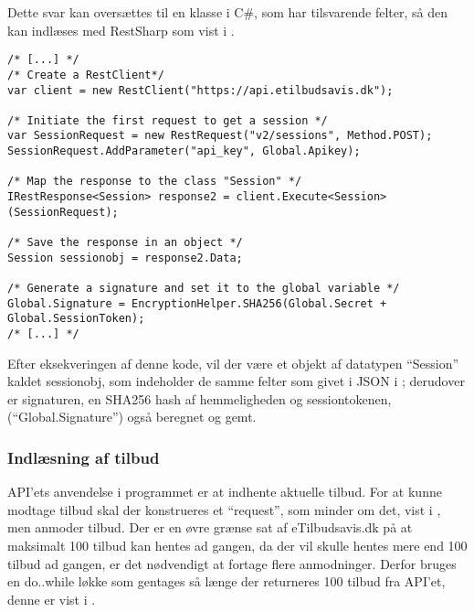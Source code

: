 Dette svar kan oversættes til en klasse i C\#, som har tilsvarende felter, så den kan indlæses med RestSharp som vist i .

\begin{lstlisting}[caption="C\#-kode som opretter en RestClient og anvender den til at oprette et objekt med felter som svarer til JSON dataet givet fra API'en", label=lst:session]
/* [...] */
/* Create a RestClient*/
var client = new RestClient("https://api.etilbudsavis.dk");

/* Initiate the first request to get a session */
var SessionRequest = new RestRequest("v2/sessions", Method.POST);
SessionRequest.AddParameter("api_key", Global.Apikey);

/* Map the response to the class "Session" */
IRestResponse<Session> response2 = client.Execute<Session>(SessionRequest);

/* Save the response in an object */
Session sessionobj = response2.Data;

/* Generate a signature and set it to the global variable */
Global.Signature = EncryptionHelper.SHA256(Global.Secret + Global.SessionToken);
/* [...] */
\end{lstlisting}
Efter eksekveringen af denne kode, vil der være et objekt af datatypen ``Session'' kaldet sessionobj, som indeholder de samme felter som givet i JSON i ; derudover er signaturen, en SHA256 hash af hemmeligheden og sessiontokenen, (``Global.Signature'') også beregnet og gemt.

\subsubsection{Indlæsning af tilbud}
API'ets anvendelse i programmet er at indhente aktuelle tilbud.
For at kunne modtage tilbud skal der konstrueres et ``request'', som minder om det, vist i , men anmoder tilbud.
Der er en øvre grænse sat af eTilbudsavis.dk på at maksimalt 100 tilbud kan hentes ad gangen, da der vil skulle hentes mere end 100 tilbud ad gangen, er det nødvendigt at fortage flere anmodninger.
Derfor bruges en do..while løkke som gentages så længe der returneres 100 tilbud fra API'et, denne er vist i .

